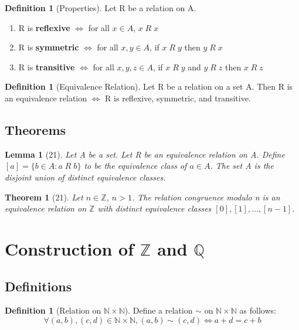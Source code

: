 \documentclass[12pt]{article}
\newtheorem*{thm*}{Theorem}
\newtheorem{lem}[thm]{Lemma}  %
\theoremstyle{definition}
\newtheorem{defn}[thm]{Definition}
\theoremstyle{remark}
\numberwithin{equation}{section}
\newcommand\Z{\mathbb Z}    %
\newcommand\N{\mathbb N}    %
\newcommand\Q{\mathbb Q}    %
\begin{document}
\begin{defn}[Properties]
        Let R be a relation on A.
        \begin{enumerate}
                \item R is \textbf{reflexive} $\iff$ for all $x \in A$, $x\;R\;x$
                \item R is \textbf{symmetric} $\iff$ for all $x,y \in A$, if $x\;R\;y$ then $y\;R\;x$
                \item R is \textbf{transitive} $\iff$ for all $x,y, z \in A$, if $x\;R\;y$ and $y\;R\;z$ then $x\;R\;z$
        \end{enumerate}
\end{defn}



\begin{defn}[Equivalence Relation]
        Let R be a relation on a set A. Then R is an equivalence relation $\iff$ R is reflexive, symmetric, and transitive.
\end{defn}


\subsection{Theorems}

\begin{lem}[21]
        Let A be a set. Let R be an equivalence relation on A. Define $[a]=\{b \in A: a\;R\;b\}$ to be the equivalence class of $a \in A$. The set A is the disjoint union of distinct equivalence classes.
\end{lem}



\begin{thm*}[21]
        Let $n \in \Z$, $n > 1$. The relation congruence modulo n is an equivalence relation on $\Z$ with distinct equivalence classes $[0],[1],...,[n-1]$.
\end{thm*}



\section{Construction of $\Z$ and $\Q$}



\subsection{Definitions}

\begin{defn}[Relation on $\N \times \N$]
        Define a relation $\sim$ on $\N \times \N$ as follows: $$\forall (a,b),(c,d) \in \N\times \N, (a,b)\sim(c,d) \iff a + d = c + b$$
\end{defn}
\end{document}
